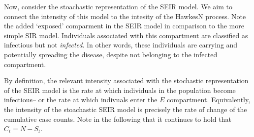\documentclass[12pt]{article}
\newtheorem{theorem}{Theorem}
\begin{document}



  






Now, consider the stoachastic representation of the SEIR model. We aim to connect the intensity of this model to the intesity of the HawkesN process. Note the added `exposed' comparment in the SEIR model in comparison to the more simple SIR model. Individuals associated with this compartment are classified as infectious but not \textit{infected}. In other words, these individuals are carrying and potentially spreading the disease, despite not belonging to the infected compartment.

By definition, the relevant intensity associated with the stochastic representation of the SEIR model is the rate at which individuals in the population become infectious– or the rate at which indivuals enter the $E$ compartment. Equivalently, the intensity of the stoachastic SEIR model is precisely the rate of change of the cumulative case counts. Note in the following that it continues to hold that $C_t = N - S_t$. 
\end{document}
